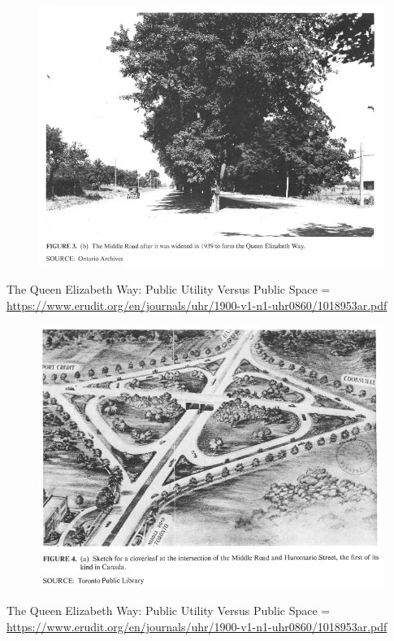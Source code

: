 \documentclass[aspectratio=169]{beamer}
\begin{document}
\begin{frame}
	
	\begin{figure}
		\centering
		\includegraphics[width=0.8\linewidth]{images/qew_1939.png}
		
	\end{figure}
	\tiny{The Queen Elizabeth Way: Public Utility Versus Public Space = \url{https://www.erudit.org/en/journals/uhr/1900-v1-n1-uhr0860/1018953ar.pdf}}
	
\end{frame}


\begin{frame}
	
	\begin{figure}
		\centering
		\includegraphics[width=0.8\linewidth]{images/qew_highway10.png}
		
	\end{figure}
	\tiny{The Queen Elizabeth Way: Public Utility Versus Public Space = \url{https://www.erudit.org/en/journals/uhr/1900-v1-n1-uhr0860/1018953ar.pdf}}
	
\end{frame}
\end{document}

